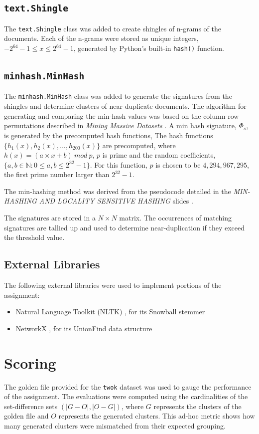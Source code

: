 \documentclass[11pt]{article}
\begin{document}
\subsection{\texttt{text.Shingle}}
The \texttt{text.Shingle} class was added to create shingles of n-grams of the documents. Each of the n-grams were stored as unique integers, $-2^{64}-1 \le x \le 2^{64}-1$, generated by Python's built-in \texttt{hash()} function.

\subsection{\texttt{minhash.MinHash}}
The \texttt{minhash.MinHash} class was added to generate the signatures from the shingles and determine clusters of near-duplicate documents. The algorithm for generating and comparing the min-hash values was based on the column-row permutations described in \textit{Mining Massive Datasets} \cite{leskovec_rajaraman_ullman_2022}. A min hash signature, $\Phi_s$, is generated by the precomputed hash functions, The hash functions $\{h_1(x),h_2(x),...,h_{200}(x)\}$ are precomputed, where $h(x)=(a \times x + b) \ mod \ p$, $p$ is prime and the random coefficients, $\{a,b \in \mathbb{N}: 0 \le a,b \le 2^{32}-1\}$. For this function, $p$ is chosen to be $4,294,967,295$, the first prime number larger than $2^{32}-1$.

The min-hashing method was derived from the pseudocode detailed in the \textit{MIN-HASHING AND LOCALITY SENSITIVE HASHING} slides \cite{kollios}.

The signatures are stored in a $N \times N$ matrix. The occurrences of matching signatures are tallied up and used to determine near-duplication if they exceed the threshold value.

\subsection{External Libraries}
The following external libraries were used to implement portions of the assignment:
\begin{itemize}
  \item Natural Language Toolkit (NLTK) \cite{bird2009natural}, for its Snowball stemmer
  \item NetworkX \cite{SciPyProceedings_11}, for its UnionFind data structure
\end{itemize}

\section{Scoring}
The golden file provided for the \texttt{twok} dataset was used to gauge the performance of the assignment. The evaluations were computed using the cardinalities of the set-difference sets $(|G-O|,|O-G|)$, where $G$ represents the clusters of the golden file and $O$ represents the generated clusters. This ad-hoc metric shows how many generated clusters were mismatched from their expected grouping.
\end{document}

